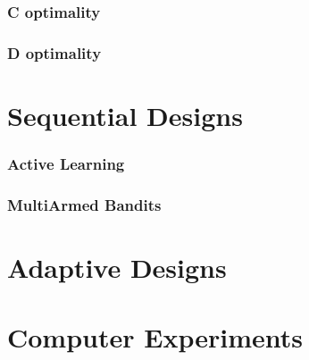 \subsubsection{C optimality}
\subsubsection{D optimality}




\section{Sequential Designs}

\subsubsection{Active Learning}


\subsubsection{MultiArmed Bandits}




\section{Adaptive Designs}



\section{Computer Experiments}

